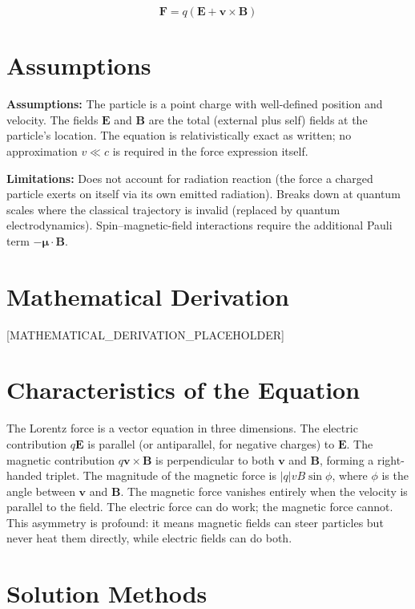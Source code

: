 \documentclass[11pt,openright]{book}
\begin{document}
\begin{equation}
\mathbf{F} = q\!\left(\mathbf{E} + \mathbf{v} \times \mathbf{B}\right)
\end{equation}
\section*{Assumptions}

\textbf{Assumptions:} The particle is a point charge with well-defined position and velocity. The fields $\mathbf{E}$ and $\mathbf{B}$ are the total (external plus self) fields at the particle's location. The equation is relativistically exact as written; no approximation $v \ll c$ is required in the force expression itself.


\textbf{Limitations:} Does not account for radiation reaction (the force a charged particle exerts on itself via its own emitted radiation). Breaks down at quantum scales where the classical trajectory is invalid (replaced by quantum electrodynamics). Spin--magnetic-field interactions require the additional Pauli term $-\boldsymbol{\mu} \cdot \mathbf{B}$.


\section*{Mathematical Derivation}

[MATHEMATICAL_DERIVATION_PLACEHOLDER]

\section*{Characteristics of the Equation}

The Lorentz force is a vector equation in three dimensions. The electric contribution $q\mathbf{E}$ is parallel (or antiparallel, for negative charges) to $\mathbf{E}$. The magnetic contribution $q\mathbf{v}\times\mathbf{B}$ is perpendicular to both $\mathbf{v}$ and $\mathbf{B}$, forming a right-handed triplet. The magnitude of the magnetic force is $|q|vB\sin\phi$, where $\phi$ is the angle between $\mathbf{v}$ and $\mathbf{B}$. The magnetic force vanishes entirely when the velocity is parallel to the field. The electric force can do work; the magnetic force cannot. This asymmetry is profound: it means magnetic fields can steer particles but never heat them directly, while electric fields can do both.
\section*{Solution Methods}
\end{document}
